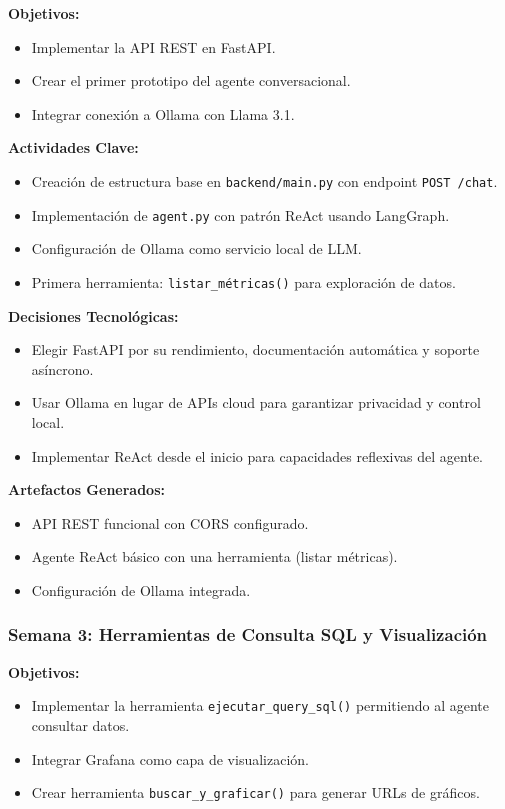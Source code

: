 \documentclass[11pt, a4paper]{report}
\begin{document}
\textbf{Objetivos:}
\begin{itemize}
    \item Implementar la API REST en FastAPI.
    \item Crear el primer prototipo del agente conversacional.
    \item Integrar conexión a Ollama con Llama 3.1.
\end{itemize}

\textbf{Actividades Clave:}
\begin{itemize}
    \item Creación de estructura base en \texttt{backend/main.py} con endpoint \texttt{POST /chat}.
    \item Implementación de \texttt{agent.py} con patrón ReAct usando LangGraph.
    \item Configuración de Ollama como servicio local de LLM.
    \item Primera herramienta: \texttt{listar\_métricas()} para exploración de datos.
\end{itemize}

\textbf{Decisiones Tecnológicas:}
\begin{itemize}
    \item Elegir FastAPI por su rendimiento, documentación automática y soporte asíncrono.
    \item Usar Ollama en lugar de APIs cloud para garantizar privacidad y control local.
    \item Implementar ReAct desde el inicio para capacidades reflexivas del agente.
\end{itemize}

\textbf{Artefactos Generados:}
\begin{itemize}
    \item API REST funcional con CORS configurado.
    \item Agente ReAct básico con una herramienta (listar métricas).
    \item Configuración de Ollama integrada.
\end{itemize}

\subsubsection{Semana 3: Herramientas de Consulta SQL y Visualización}

\textbf{Objetivos:}
\begin{itemize}
    \item Implementar la herramienta \texttt{ejecutar\_query\_sql()} permitiendo al agente consultar datos.
    \item Integrar Grafana como capa de visualización.
    \item Crear herramienta \texttt{buscar\_y\_graficar()} para generar URLs de gráficos.
\end{itemize}
\end{document}

